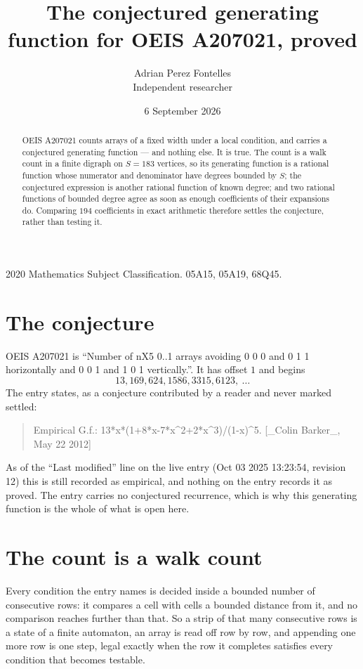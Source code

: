 \documentclass[11pt,a4paper]{article}
\title{The conjectured generating function for OEIS A207021, proved}
\author{Adrian Perez Fontelles\\ \small Independent researcher}
\date{6 September 2026}
\theoremstyle{plain}
\theoremstyle{definition}
\begin{document}
\maketitle

\begin{abstract}
OEIS A207021 counts arrays of a fixed width under a local condition, and carries a conjectured
generating function --- and nothing else. It is true. The count is a walk count in a finite
digraph on $S=183$ vertices, so its generating function is a rational function whose numerator
and denominator have degrees bounded by $S$; the conjectured expression is another rational
function of known degree; and two rational functions of bounded degree agree as soon as enough
coefficients of their expansions do. Comparing $194$ coefficients in exact arithmetic
therefore settles the conjecture, rather than testing it.
\end{abstract}

\noindent\small 2020 Mathematics Subject Classification. 05A15, 05A19, 68Q45.\normalsize

\section{The conjecture}

OEIS A207021 is ``Number of nX5 0..1 arrays avoiding 0 0 0 and 0 1 1 horizontally and 0 0 1 and 1 0 1 vertically.''. It has offset $1$ and begins
\[
13, 169, 624, 1586, 3315, 6123,\ \dots
\]
The entry states, as a conjecture contributed by a reader and never marked settled:
\begin{quote}
Empirical G.f.: 13*x*(1+8*x-7*x\^{}2+2*x\^{}3)/(1-x)\^{}5. [\_Colin Barker\_, May 22 2012]
\end{quote}
As of the ``Last modified'' line on the live entry (Oct 03 2025 13:23:54, revision 12) this is still
recorded as empirical, and nothing on the entry records it as proved. The entry carries no
conjectured recurrence, which is why this generating function is the whole of what is open
here.

\section{The count is a walk count}

Every condition the entry names is decided inside a bounded number of consecutive rows: it
compares a cell with cells a bounded distance from it, and no comparison reaches further than
that. So a strip of that many consecutive rows is a state of a finite automaton, an array is
read off row by row, and appending one more row is one step, legal exactly when the row it
completes satisfies every condition that becomes testable.
\end{document}
